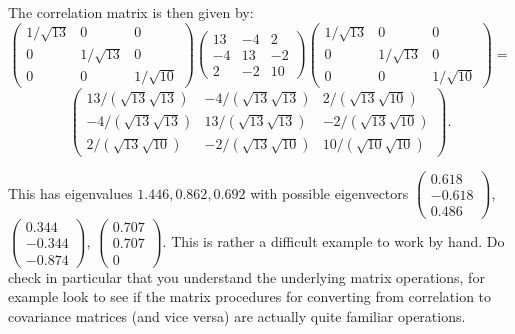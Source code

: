 \documentclass{article}
\begin{document}
\begin{enumerate}
The correlation matrix is then given by:
\begin{displaymath}
\left( \begin{array}{ccc} 1/\sqrt{13} & 0 & 0 \\ 0 & 1/\sqrt{13} & 0 \\ 0 & 0 & 1/\sqrt{10} \end{array} \right) \left( \begin{array}{rrr} 13 & -4 & 2\\ -4 & 13 & -2 \\ 2 & -2 & 10 \end{array} \right) \left( \begin{array}{ccc} 1/\sqrt{13} & 0 & 0 \\ 0 & 1/\sqrt{13} & 0 \\ 0 & 0 & 1/\sqrt{10} \end{array} \right) = 
\end{displaymath}
\begin{displaymath}
\left( \begin{array}{ccc} 13 / (\sqrt{13} \sqrt{13}) & -4 / (\sqrt{13} \sqrt{13}) & 2 / (\sqrt{13} \sqrt{10}) \\
-4 / (\sqrt{13} \sqrt{13}) &  13 / (\sqrt{13} \sqrt{13}) & - 2 / (\sqrt{13} \sqrt{10}) \\
 2 / (\sqrt{13} \sqrt{10}) &  -2 / (\sqrt{13} \sqrt{10}) & 10 / (\sqrt{10} \sqrt{10}) \end{array} \right).
\end{displaymath}

This has eigenvalues $1.446, 0.862, 0.692$ with possible eigenvectors $\left( \begin{array}{c} 0.618 \\ -0.618 \\ 0.486 \end{array} \right)$, 
$\left( \begin{array}{c} 0.344 \\ -0.344 \\ -0.874 \end{array} \right)$,
$\left( \begin{array}{c} 0.707 \\ 0.707 \\ 0 \end{array} \right) $.   This is rather a difficult example to work by hand.   Do check in particular that you understand the underlying matrix operations, for example look to see if the matrix procedures for converting from correlation to covariance matrices (and vice versa) are actually quite familiar operations.





\end{enumerate}
\end{document}
